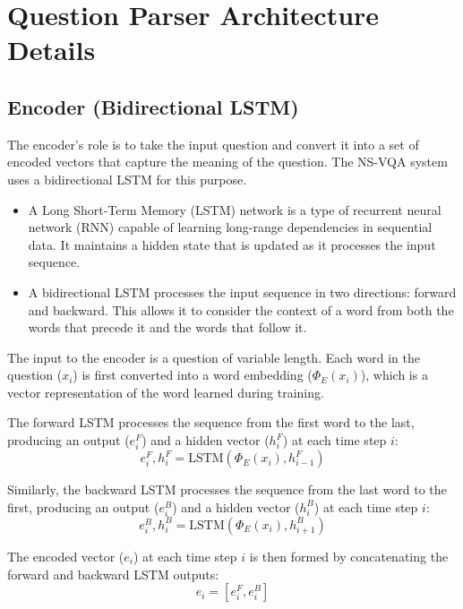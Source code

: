 \documentclass[10pt, oneside]{article}
\begin{document}
\section{Question Parser Architecture Details}

\subsection{Encoder (Bidirectional LSTM)}
The encoder's role is to take the input question and convert it into a set of encoded vectors that capture the meaning of the question. The NS-VQA system uses a bidirectional LSTM for this purpose.
\begin{itemize}
    \item A Long Short-Term Memory (LSTM) network is a type of recurrent neural network (RNN) capable of learning long-range dependencies in sequential data. It maintains a hidden state that is updated as it processes the input sequence.
    \item A bidirectional LSTM processes the input sequence in two directions: forward and backward. This allows it to consider the context of a word from both the words that precede it and the words that follow it.
\end{itemize}

The input to the encoder is a question of variable length. Each word in the question ($x_i$) is first converted into a word embedding ($\Phi_E\left(x_i\right)$), which is a vector representation of the word learned during training.

The forward LSTM processes the sequence from the first word to the last, producing an output ($e_i^F$) and a hidden vector ($h_i^F$) at each time step $i$:
\begin{equation}
    e_i^F,h_i^F=\mathrm{LSTM}\left(\Phi_E\left(x_i\right),h_{i-1}^F\right)
\end{equation}

Similarly, the backward LSTM processes the sequence from the last word to the first, producing an output ($e_i^B$) and a hidden vector ($h_i^B$) at each time step $i$:
\begin{equation}
    e_i^B,h_i^B=\mathrm{LSTM}\left(\Phi_E\left(x_i\right),h_{i+1}^B\right)
\end{equation}

The encoded vector ($e_i$) at each time step $i$ is then formed by concatenating the forward and backward LSTM outputs:
\begin{equation}
    e_i=\left[e_i^F,e_i^B\right]
\end{equation}
\end{document}
